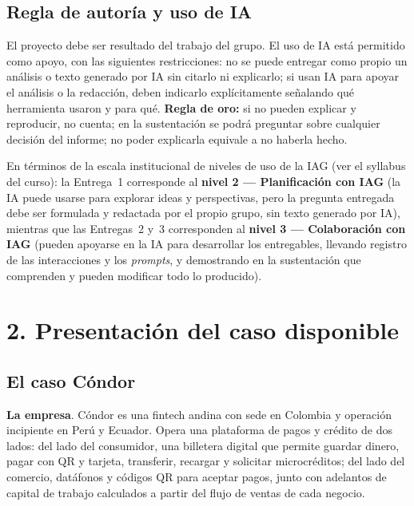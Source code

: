 \documentclass[11pt,letterpaper]{article}
\begin{document}
\subsection{Regla de autoría y uso de IA}

El proyecto debe ser resultado del trabajo del grupo. El uso de IA está permitido como apoyo, con las siguientes restricciones: no se puede entregar como propio un análisis o texto generado por IA sin citarlo ni explicarlo; si usan IA para apoyar el análisis o la redacción, deben indicarlo explícitamente señalando qué herramienta usaron y para qué. \textbf{Regla de oro:} si no pueden explicar y reproducir, no cuenta; en la sustentación se podrá preguntar sobre cualquier decisión del informe; no poder explicarla equivale a no haberla hecho.

En términos de la escala institucional de niveles de uso de la IAG (ver el syllabus del curso): la Entrega~1 corresponde al \textbf{nivel 2 --- Planificación con IAG} (la IA puede usarse para explorar ideas y perspectivas, pero la pregunta entregada debe ser formulada y redactada por el propio grupo, sin texto generado por IA), mientras que las Entregas~2 y~3 corresponden al \textbf{nivel 3 --- Colaboración con IAG} (pueden apoyarse en la IA para desarrollar los entregables, llevando registro de las interacciones y los \textit{prompts}, y demostrando en la sustentación que comprenden y pueden modificar todo lo producido).

\clearpage
\section{2. Presentación del caso disponible}

\subsection{El caso Cóndor}
\textbf{La empresa}. Cóndor es una fintech andina con sede en Colombia y operación incipiente en Perú y Ecuador. Opera una plataforma de pagos y crédito de dos lados: del lado del consumidor, una billetera digital que permite guardar dinero, pagar con QR y tarjeta, transferir, recargar y solicitar microcréditos; del lado del comercio, datáfonos y códigos QR para aceptar pagos, junto con adelantos de capital de trabajo calculados a partir del flujo de ventas de cada negocio.
\end{document}
